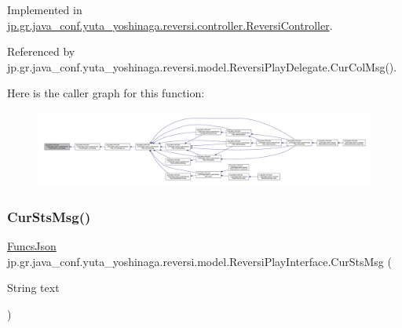 Implemented in \hyperlink{classjp_1_1gr_1_1java__conf_1_1yuta__yoshinaga_1_1reversi_1_1controller_1_1_reversi_controller_aa4c4d8fe61727c848170cff7120e82db}{jp.\+gr.\+java\+\_\+conf.\+yuta\+\_\+yoshinaga.\+reversi.\+controller.\+Reversi\+Controller}.



Referenced by jp.\+gr.\+java\+\_\+conf.\+yuta\+\_\+yoshinaga.\+reversi.\+model.\+Reversi\+Play\+Delegate.\+Cur\+Col\+Msg().

Here is the caller graph for this function\+:
\nopagebreak
\begin{figure}[H]
\begin{center}
\leavevmode
\includegraphics[width=350pt]{interfacejp_1_1gr_1_1java__conf_1_1yuta__yoshinaga_1_1reversi_1_1model_1_1_reversi_play_interface_a32a831288d0964d1c3a8bd58f539cfda_icgraph}
\end{center}
\end{figure}
\mbox{\label{interfacejp_1_1gr_1_1java__conf_1_1yuta__yoshinaga_1_1reversi_1_1model_1_1_reversi_play_interface_ae9fe1e8ed6fca483d91b4647d8c86a83}} 
\subsubsection{\texorpdfstring{Cur\+Sts\+Msg()}{CurStsMsg()}}
{\footnotesize\ttfamily \hyperlink{classjp_1_1gr_1_1java__conf_1_1yuta__yoshinaga_1_1reversi_1_1model_1_1_funcs_json}{Funcs\+Json} jp.\+gr.\+java\+\_\+conf.\+yuta\+\_\+yoshinaga.\+reversi.\+model.\+Reversi\+Play\+Interface.\+Cur\+Sts\+Msg (\begin{DoxyParamCaption}\item[{String}]{text }\end{DoxyParamCaption})}




